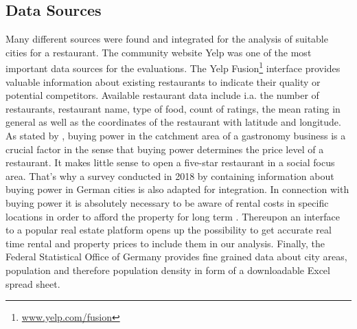 \subsection{Data Sources}
\label{subsec:sources}
Many different sources were found and integrated for the analysis of suitable cities for a restaurant. The community website Yelp was one of the most important data sources for the evaluations. The Yelp Fusion\footnote{\href{https://www.yelp.com/fusion}{www.yelp.com/fusion}} interface provides valuable information about existing restaurants to indicate their quality or potential competitors. Available restaurant data include i.a. the number of restaurants, restaurant name, type of food, count of ratings, the mean rating in general as well as the coordinates of the restaurant with latitude and longitude.%
\newline
As stated by \cite{locana}, buying power in the catchment area of a gastronomy business is a crucial factor in the sense that buying power determines the price level of a restaurant. It makes little sense to open a five-star restaurant in a social focus area. That's why a survey conducted in 2018 by \cite{buyingpower} containing information about buying power in German cities is also adapted for integration.
\newline
In connection with buying power it is absolutely necessary to be aware of rental costs in specific locations in order to afford the property for long term \cite{locana}. Thereupon an interface to a popular real estate platform \cite{ImmoScout} opens up the possibility to get accurate real time rental and property prices to include them in our analysis.
\newline
Finally, the Federal Statistical Office of Germany provides fine grained data about city areas, population and therefore population density in form of a downloadable Excel spread sheet.\cite{destatis}

